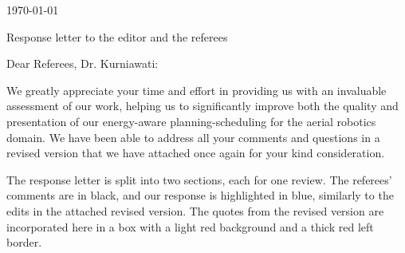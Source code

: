 \documentclass[10pt]{letter}
\newcommand{\yesterday}{{\AdvanceDate[-1]\today}}
\begin{document}
\pagestyle{plain}
\selectfont




\begin{flushright}%
  \yesterday\end{flushright}

\vspace{2em}


{\centering Response letter to the editor and the referees}

\vspace{5em}

Dear Referees, Dr. Kurniawati:

\vspace{1em}

We greatly appreciate your time and effort in providing us with an invaluable assessment of our work, helping us to significantly improve both the quality and presentation of our energy-aware planning-scheduling for the aerial robotics domain. We have been able to address all your comments and questions in a revised version that we have attached once again for your kind consideration. 

The response letter is split into two sections, each for one review. The referees' comments are in black, and our response is highlighted in blue, similarly to the edits in the attached revised version. The quotes from the revised version are incorporated here in a box with a light red background and a thick red left border.
\end{document}
